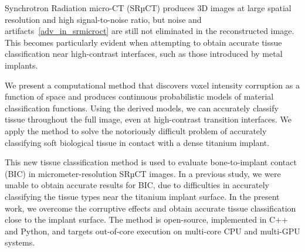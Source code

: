 Synchrotron Radiation micro-CT (SRµCT) produces 3D images at large spatial
resolution and high signal-to-noise ratio, but noise and
artifacts~\ref{adv_in_srmicroct} are still not eliminated in the reconstructed
image. This becomes particularly evident when attempting to obtain accurate
tissue classification near high-contrast interfaces, such as those introduced
by metal implants.

We present a computational method that discovers voxel intensity corruption as
a function of space and produces continuous probabilistic models of material
classification functions. Using the derived models, we can accurately classify
tissue throughout the full image, even at high-contrast transition interfaces.
We apply the method to solve the notoriously difficult problem of accurately
classifying soft biological tissue in contact with a dense titanium implant.

This new tissue classification method is used to evaluate bone-to-implant
contact (BIC) in micrometer-resolution SRµCT images. In a previous study, we
were unable to obtain accurate results for BIC, due to difficulties in
accurately classifying the tissue types near the titanium implant surface. In
the present work, we overcome the corruptive effects and obtain accurate tissue
classification close to the implant surface.
The method is open-source, implemented in C++ and Python, and targets
out-of-core execution on multi-core CPU and multi-GPU systems.

